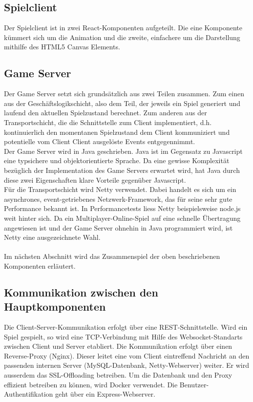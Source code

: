 \documentclass[11pt,ngerman]{article}
\begin{document}
        \subsection{Spielclient}
        Der Spielclient ist in zwei \Gls{React}-Komponenten aufgeteilt. Die eine Komponente kümmert sich um die Animation und die zweite, einfachere um die Darstellung mithilfe des \Gls{HTML5 Canvas} Elements.

        \label{SoftwarearchitekturGameServer}
        \subsection{\Gls{Game Server}}
        Der \Gls{Game Server} setzt sich grundsätzlich aus zwei Teilen zusammen. Zum einen aus der Geschäftslogikschicht, also dem Teil, der jeweils ein Spiel generiert und laufend den aktuellen Spielzustand berechnet. Zum anderen aus der Transportschicht, die die Schnittstelle zum Client implementiert, d.h. kontinuierlich den momentanen Spielzustand dem Client kommuniziert und potentielle vom Client Client ausgelöste Events entgegennimmt.\\
        Der \Gls{Game Server} wird in Java geschrieben. Java ist im Gegensatz zu Javascript eine typsichere und objektorientierte Sprache. Da eine gewisse Komplexität bezüglich der Implementation des \Gls{Game Server}s erwartet wird, hat Java durch diese zwei Eigenschaften klare Vorteile gegenüber Javascript.\\
        Für die Transportschicht wird Netty verwendet. Dabei handelt es sich um ein asynchrones, event-getriebenes Netzwerk-Framework, das für seine sehr gute Performance bekannt ist. In Performancetests liess Netty beispielsweise node.js weit hinter sich.\cite{NettyPerformancetests} Da ein Multiplayer-Online-Spiel auf eine schnelle Übertragung angewiesen ist und der \Gls{Game Server} ohnehin in Java programmiert wird, ist Netty eine ausgezeichnete Wahl.\\
        \\
        Im nächsten Abschnitt wird das Zusammenspiel der oben beschriebenen Komponenten erläutert.

        \subsection{Kommunikation zwischen den Hauptkomponenten}
        Die Client-Server-Kommunikation erfolgt über eine REST-Schnittstelle. Wird ein Spiel gespielt, so wird eine TCP-Verbindung mit Hilfe des \Gls{Websocket}-Standarts zwischen Client und Server etabliert. Die Kommunikation erfolgt über einen \Gls{Reverse-Proxy} (Nginx). Dieser leitet eine vom Client eintreffend Nachricht an den passenden internen Server (MySQL-Datenbank, Netty-Webserver) weiter. Er wird ausserdem das SSL-Offloading betreiben. Um die Datenbank und den Proxy effizient betreiben zu können, wird Docker verwendet. Die Benutzer-Authentifikation geht über ein Express-\Gls{Webserver}.\\
\end{document}
